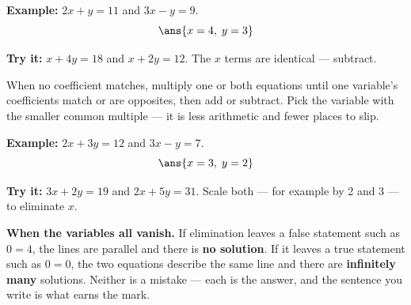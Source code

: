 \documentclass[12pt]{article}
\begin{document}
\begin{examplebox}
\textbf{Example:} $2x + y = 11$ and $3x - y = 9$.
\[ \ans{x = 4,\; y = 3} \]
\end{examplebox}

\begin{tryitbox}
\textbf{Try it:} $x + 4y = 18$ and $x + 2y = 12$. The $x$ terms are identical
--- subtract.

\end{tryitbox}


\begin{formulabox}
When no coefficient matches, multiply one or both equations until one variable's
coefficients match or are opposites, then add or subtract. Pick the variable
with the smaller common multiple --- it is less arithmetic and fewer places to
slip.
\end{formulabox}

\begin{examplebox}
\textbf{Example:} $2x + 3y = 12$ and $3x - y = 7$.
\[ \ans{x = 3,\; y = 2} \]
\end{examplebox}

\begin{tryitbox}
\textbf{Try it:} $3x + 2y = 19$ and $2x + 5y = 31$. Scale both --- for example
by 2 and 3 --- to eliminate $x$.

\end{tryitbox}

\begin{watchoutbox}
\textbf{When the variables all vanish.} If elimination leaves a false statement
such as $0 = 4$, the lines are parallel and there is \textbf{no solution}. If it
leaves a true statement such as $0 = 0$, the two equations describe the same
line and there are \textbf{infinitely many} solutions. Neither is a mistake ---
each is the answer, and the sentence you write is what earns the mark.
\end{watchoutbox}
\end{document}
